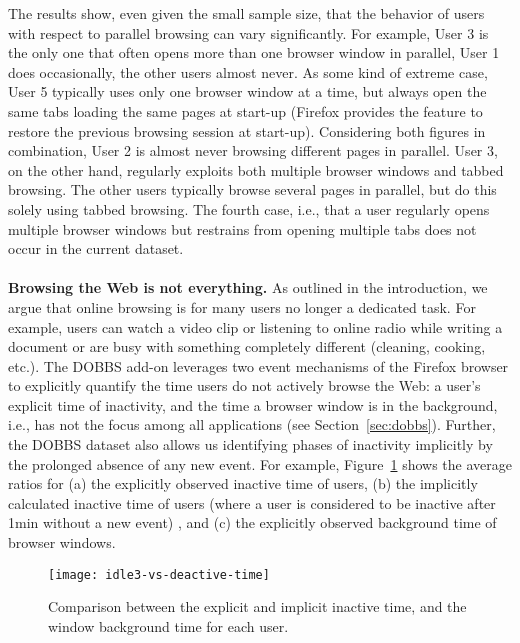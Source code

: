 \documentclass[11pt,fleqn,twoside]{article}
\begin{document}
The results show, even given the small sample size, that the behavior of users with respect to parallel browsing can vary significantly. For example, User 3 is the only one that often opens more than one browser window in parallel, User 1 does occasionally, the other users almost never. As some kind of extreme case, User 5 typically uses only one browser window at a time, but always open the same tabs loading the same pages at start-up (Firefox provides the feature to restore the previous browsing session at start-up). Considering both figures in combination, User 2 is almost never browsing different pages in parallel. User 3, on the other hand, regularly exploits both multiple browser windows and tabbed browsing. The other users typically browse several pages in parallel, but do this solely using tabbed browsing. The fourth case, i.e., that a user regularly opens multiple browser windows but restrains from opening multiple tabs does not occur in the current dataset.
\\
\\
\textbf{Browsing the Web is not everything.} As outlined in the introduction, we argue that online browsing is for many users no longer a dedicated task. For example, users can watch a video clip or listening to online radio while writing a document or are busy with something completely different (cleaning, cooking, etc.). The DOBBS add-on leverages two event mechanisms of the Firefox browser to explicitly quantify the time users do not actively browse the Web: a user's explicit time of inactivity, and the time a browser window is in the background, i.e., has not the focus among all applications (see Section~\ref{sec:dobbs}). Further, the DOBBS dataset also allows us identifying phases of inactivity implicitly by the prolonged absence of any new event. For example, Figure~\ref{fig:idle-vs-deactive-time3} shows the average ratios for (a) the explicitly observed inactive time of users, (b) the implicitly calculated inactive time of users (where a user is considered to be inactive after 1min without a new event)
, and (c) the explicitly observed background time of browser windows. 
\begin{figure}[t]
 \centering
 \texttt{[image: idle3-vs-deactive-time]}
 \caption{Comparison between the explicit and implicit inactive time, and the window background time for each user.}
 \label{fig:idle-vs-deactive-time3}
\end{figure}
\end{document}
